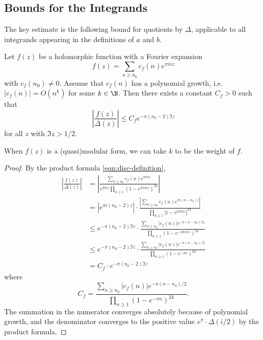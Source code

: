 \subsection{Bounds for the Integrands}

The key estimate is the following bound for quotients by $\Delta$, applicable to all integrands appearing in the definitions of $a$ and $b$.

\begin{lemma}\label{lemma:mod-div-disc-bound}\leanok
Let $f(z)$ be a holomorphic function with a Fourier expansion
\begin{equation}
    f(z) = \sum_{n \ge n_0} c_f(n) e^{\pi i n z}
\end{equation}
with $c_f(n_0) \ne 0$.
Assume that $c_f(n)$ has a polynomial growth, i.e. $|c_f(n)| = O(n^k)$ for some $k \in \N$.
Then there exists a constant $C_f > 0$ such that
\begin{equation}
    \left|\frac{f(z)}{\Delta(z)}\right| \le C_f e^{-\pi (n_0 - 2) \Im z}
\end{equation}
for all $z$ with $\Im z > 1/2$.
\end{lemma}
When $f(z)$ is a (quasi)modular form, we can take $k$ to be the weight of $f$.


\begin{proof}\leanok
By the product formula \eqref{eqn:disc-definition},
\begin{align}
    \left|\frac{f(z)}{\Delta(z)}\right| &= \left|\frac{\sum_{n \ge n_0} c_f(n) e^{\pi i n z}}{e^{2 \pi i z}\prod_{n \ge 1} (1 - e^{2\pi i n z})^{24}}\right| \\
    &= |e^{\pi i (n_0 - 2)z}| \cdot \frac{|\sum_{n \ge n_0} c_f(n) e^{\pi i (n - n_0) z}|}{\prod_{n \ge 1} |1 - e^{2\pi i n z}|^{24}} \\
    &\le e^{-\pi (n_0 - 2) \Im z} \cdot \frac{\sum_{n \ge n_0} |c_f(n)| e^{-\pi (n - n_0) \Im z}}{\prod_{n \ge 1} (1 - e^{- 2\pi n \Im z})^{24}} \\
    &\le e^{-\pi (n_0 - 2) \Im z} \cdot \frac{\sum_{n \ge n_0} |c_f(n)| e^{-\pi (n - n_0) / 2}}{\prod_{n \ge 1} (1 - e^{-\pi n})^{24}} \\
    &= C_f \cdot e^{-\pi (n_0 - 2) \Im z}
\end{align}
where
\begin{equation}
    C_f = \frac{\sum_{n \ge n_0} |c_f(n)| e^{-\pi (n - n_0) / 2}}{\prod_{n \ge 1} (1 - e^{-\pi n})^{24}}.
\end{equation}
The summation in the numerator converges absolutely because of polynomial growth, and the denominator converges to the positive value $e^{\pi} \cdot \Delta(i/2)$ by the product formula.
\end{proof}

